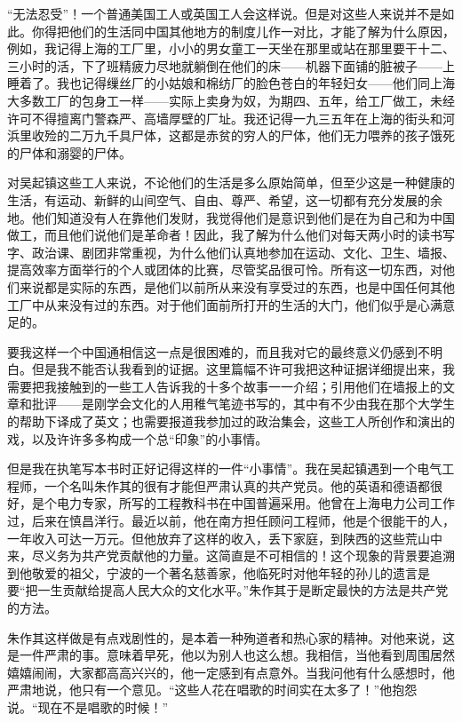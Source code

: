 \documentclass[10pt]{book}
\begin{document}
“无法忍受”！一个普通美国工人或英国工人会这样说。但是对这些人来说并不是如此。你得把他们的生活同中国其他地方的制度儿作一对比，才能了解为什么原因，例如，我记得上海的工厂里，小小的男女童工一天坐在那里或站在那里要干十二、三小时的活，下了班精疲力尽地就躺倒在他们的床——机器下面铺的脏被子——上睡着了。我也记得缫丝厂的小姑娘和棉纺厂的脸色苍白的年轻妇女——他们同上海大多数工厂的包身工一样——实际上卖身为奴，为期四、五年，给工厂做工，未经许可不得擅离门警森严、高墙厚壁的厂址。我还记得一九三五年在上海的街头和河浜里收殓的二万九千具尸体，这都是赤贫的穷人的尸体，他们无力喂养的孩子饿死的尸体和溺婴的尸体。

对吴起镇这些工人来说，不论他们的生活是多么原始简单，但至少这是一种健康的生活，有运动、新鲜的山间空气、自由、尊严、希望，这一切都有充分发展的余地。他们知道没有人在靠他们发财，我觉得他们是意识到他们是在为自己和为中国做工，而且他们说他们是革命者！因此，我了解为什么他们对每天两小时的读书写字、政治课、剧团非常重视，为什么他们认真地参加在运动、文化、卫生、墙报、提高效率方面举行的个人或团体的比赛，尽管奖品很可怜。所有这一切东西，对他们来说都是实际的东西，是他们以前所从来没有享受过的东西，也是中国任何其他工厂中从来没有过的东西。对于他们面前所打开的生活的大门，他们似乎是心满意足的。

要我这样一个中国通相信这一点是很困难的，而且我对它的最终意义仍感到不明白。但是我不能否认我看到的证据。这里篇幅不许可我把这种证据详细提出来，我需要把我接触到的一些工人告诉我的十多个故事一一介绍；引用他们在墙报上的文章和批评——是刚学会文化的人用稚气笔迹书写的，其中有不少由我在那个大学生的帮助下译成了英文；也需要报道我参加过的政治集会，这些工人所创作和演出的戏，以及许许多多构成一个总“印象”的小事情。

但是我在执笔写本书时正好记得这样的一件“小事情”。我在吴起镇遇到一个电气工程师，一个名叫朱作其的很有才能但严肃认真的共产党员。他的英语和德语都很好，是个电力专家，所写的工程教科书在中国普遍采用。他曾在上海电力公司工作过，后来在慎昌洋行。最近以前，他在南方担任顾问工程师，他是个很能干的人，一年收入可达一万元。但他放弃了这样的收入，丢下家庭，到陕西的这些荒山中来，尽义务为共产党贡献他的力量。这简直是不可相信的！这个现象的背景要追溯到他敬爱的祖父，宁波的一个著名慈善家，他临死时对他年轻的孙儿的遗言是要“把一生贡献给提高人民大众的文化水平。”朱作其于是断定最快的方法是共产党的方法。

朱作其这样做是有点戏剧性的，是本着一种殉道者和热心家的精神。对他来说，这是一件严肃的事。意味着早死，他以为别人也这么想。我相信，当他看到周围居然嬉嬉闹闹，大家都高高兴兴的，他一定感到有点意外。当我问他有什么感想时，他严肃地说，他只有一个意见。“这些人花在唱歌的时间实在太多了！”他抱怨说。“现在不是唱歌的时候！”
\end{document}
